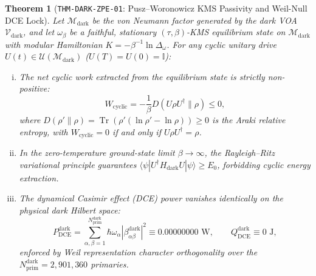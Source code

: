 \documentclass[11pt,onecolumn]{article}
\newtheorem{theorem}{Theorem}
\DeclareMathOperator{\Tr}{Tr}
\begin{document}
\begin{theorem}[\texttt{THM-DARK-ZPE-01}: Pusz--Woronowicz KMS Passivity and Weil-Null DCE Lock]
Let $\mathcal{M}_{\text{dark}}$ be the von Neumann factor generated by the dark VOA $\mathcal{V}_{\text{dark}}$, and let $\omega_\beta$ be a faithful, stationary $(\tau,\beta)$-KMS equilibrium state on $\mathcal{M}_{\text{dark}}$ with modular Hamiltonian $K = -\beta^{-1}\ln\Delta_{\omega}$. For any cyclic unitary drive $U(t) \in \mathcal{U}(\mathcal{M}_{\text{dark}})$ ($U(T)=U(0)=\mathbb{I}$):
\begin{enumerate}[(i)]
    \item The net cyclic work extracted from the equilibrium state is strictly non-positive:
    \begin{equation}
    W_{\text{cyclic}} = -\frac{1}{\beta} D(U\rho U^\dagger \parallel \rho) \le 0,
    \label{eq:thm_dark_zpe_01_passivity}
    \end{equation}
    where $D(\rho' \parallel \rho) = \Tr(\rho'(\ln\rho' - \ln\rho)) \ge 0$ is the Araki relative entropy, with $W_{\text{cyclic}} = 0$ if and only if $U\rho U^\dagger = \rho$.
    \item In the zero-temperature ground-state limit $\beta \to \infty$, the Rayleigh--Ritz variational principle guarantees $\langle \psi | U^\dagger H_{\text{dark}} U | \psi \rangle \ge E_0$, forbidding cyclic energy extraction.
    \item The dynamical Casimir effect (DCE) power vanishes identically on the physical dark Hilbert space:
    \begin{equation}
    P_{\text{DCE}}^{\text{dark}} = \sum_{\alpha,\beta=1}^{N_{\text{prim}}^{\text{dark}}} \hbar\omega_\alpha |\beta_{\alpha\beta}^{\text{dark}}|^2 \equiv 0.00000000\text{ W}, \qquad Q_{\text{DCE}}^{\text{dark}} \equiv 0\text{ J},
    \label{eq:thm_dark_zpe_01_dce}
    \end{equation}
    enforced by Weil representation character orthogonality over the $N_{\text{prim}}^{\text{dark}} = 2{,}901{,}360$ primaries.
\end{enumerate}
\end{theorem}
\end{document}
